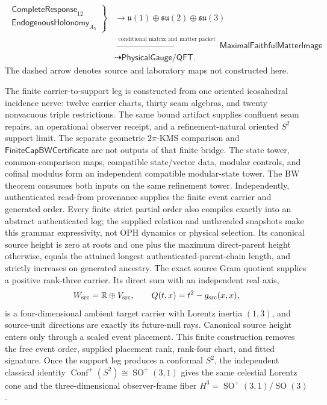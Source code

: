 \endgroup
\[
\begin{aligned}
\left.
\begin{gathered}
\mathsf{CompleteResponse}_{12}\\
\mathsf{EndogenousHolonomy}_{A_5}
\end{gathered}
\right\}
&\longrightarrow
\mathfrak u(1)\oplus\mathfrak{su}(2)\oplus\mathfrak{su}(3)\\
&\xrightarrow{\;\text{conditional matrix and matter packet}\;}
\mathsf{MaximalFaithfulMatterImage}\\
&\dashrightarrow \mathsf{PhysicalGauge/QFT}.
\end{aligned}
\]
The dashed arrow denotes source and laboratory maps not constructed here.

The finite carrier-to-support leg is constructed from one oriented
icosahedral incidence nerve: twelve carrier charts, thirty seam algebras, and
twenty nonvacuous triple restrictions. The same bound artifact supplies
confluent seam repairs, an operational observer receipt, and a
refinement-natural oriented \(S^2\) support limit. The separate geometric
\(2\pi\)-KMS comparison and \(\mathsf{FiniteCapBWCertificate}\) are not
outputs of that finite bridge. The state tower, common-comparison maps,
compatible state/vector data, modular controls, and cofinal modulus form an
independent compatible modular-state tower. The BW theorem consumes both
inputs on the same refinement tower. Independently, authenticated read-from
provenance supplies the finite event carrier and generated order. Every finite
strict partial order also compiles exactly into an abstract authenticated log;
the supplied relation and unthreaded snapshots make this grammar expressivity,
not OPH dynamics or physical selection. Its
canonical source height is zero at roots and one plus the maximum direct-parent
height otherwise, equals the attained longest authenticated-parent-chain
length, and strictly increases on generated ancestry. The exact source Gram quotient supplies a positive rank-three
carrier. Its direct sum with an independent real axis,
\[
  W_{\rm src}=\mathbb R\oplus V_{\rm src},\qquad
  Q(t,x)=t^2-g_{\rm src}(x,x),
\]
is a four-dimensional ambient target carrier with Lorentz inertia \((1,3)\), and source-unit
directions are exactly its future-null rays. Canonical source height enters
only through a scaled event placement. This finite construction removes
the free event order, supplied placement rank, rank-four chart, and fitted signature. Once
the support leg produces a conformal \(S^2\), the independent classical
identity \(\operatorname{Conf}^+(S^2)\cong\operatorname{SO}^+(3,1)\) gives
the same celestial Lorentz cone and the three-dimensional observer-frame
fiber \(H^3=\operatorname{SO}^+(3,1)/\operatorname{SO}(3)\).

